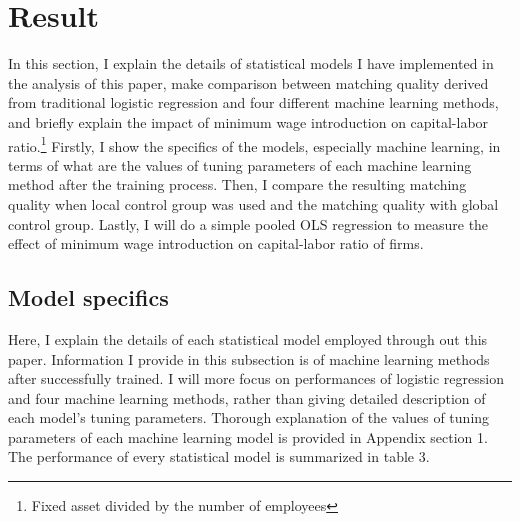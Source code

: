\documentclass[11pt,a4paper,oneside]{article}
\begin{document}
\section{Result}
In this section, I explain the details of statistical models I have implemented in the analysis of this paper, make comparison between matching quality derived from traditional logistic regression and four different machine learning methods, and briefly explain the impact of minimum wage introduction on capital-labor ratio.\footnote{Fixed asset divided by the number of employees} Firstly, I show the specifics of the models, especially machine learning, in terms of what are the values of tuning parameters of each machine learning method after the training process. Then, I compare the resulting matching quality when local control group was used and the matching quality with global control group. Lastly, I will do a simple pooled OLS regression to measure the effect of minimum wage introduction on capital-labor ratio of firms.
\subsection{Model specifics}
Here, I explain the details of each statistical model employed through out this paper. Information I provide in this subsection is of machine learning methods after successfully trained. I will more focus on performances of logistic regression and four machine learning methods, rather than giving detailed description of each model's tuning parameters. Thorough explanation of the values of tuning parameters of each machine learning model is provided in Appendix section 1. The performance of every statistical model is summarized in table 3. 
\end{document}
